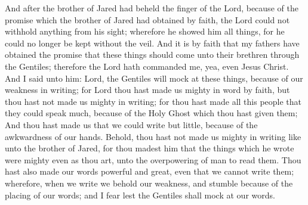 And after the brother of Jared had beheld the finger of the Lord, because of the promise which the brother of Jared had obtained by faith, the Lord could not withhold anything from his sight; wherefore he showed him all things, for he could no longer be kept without the veil.
\bverse \iffalse And it is by faith that my fathers have obtained the promise that these things should come unto their brethren through the Gentiles; therefore the Lord hath commanded me, yea, even Jesus Christ. \fi
And it is by faith that my fathers have obtained the promise that these things should come unto their brethren through the Gentiles; therefore the Lord hath commanded me, yea, even Jesus Christ.
\bverse \iffalse And I said unto him: Lord, the Gentiles will mock at these things, because of our weakness in writing; for Lord thou hast made us mighty in word by faith, but thou hast not made us mighty in writing; for thou hast made all this people that they could speak much, because of the Holy Ghost which thou hast given them; \fi
And I said unto him: Lord, the Gentiles will mock at these things, because of our weakness in writing; for Lord thou hast made us mighty in word by faith, but thou hast not made us mighty in writing; for thou hast made all this people that they could speak much, because of the Holy Ghost which thou hast given them;
\bverse \iffalse And thou hast made us that we could write but little, because of the awkwardness of our hands. Behold, thou hast not made us mighty in writing like unto the brother of Jared, for thou madest him that the things which he wrote were mighty even as thou art, unto the overpowering of man to read them. \fi
And thou hast made us that we could write but little, because of the awkwardness of our hands. Behold, thou hast not made us mighty in writing like unto the brother of Jared, for thou madest him that the things which he wrote were mighty even as thou art, unto the overpowering of man to read them.
\bverse \iffalse Thou hast also made our words powerful and great, even that we cannot write them; wherefore, when we write we behold our weakness, and stumble because of the placing of our words; and I fear lest the Gentiles shall mock at our words. \fi
Thou hast also made our words powerful and great, even that we cannot write them; wherefore, when we write we behold our weakness, and stumble because of the placing of our words; and I fear lest the Gentiles shall mock at our words.
\bverse \iffalse And when I had said this, the Lord spake unto me, saying: Fools mock, but they shall mourn; and my grace is sufficient for the meek, that they shall take no advantage of your weakness; \fi
